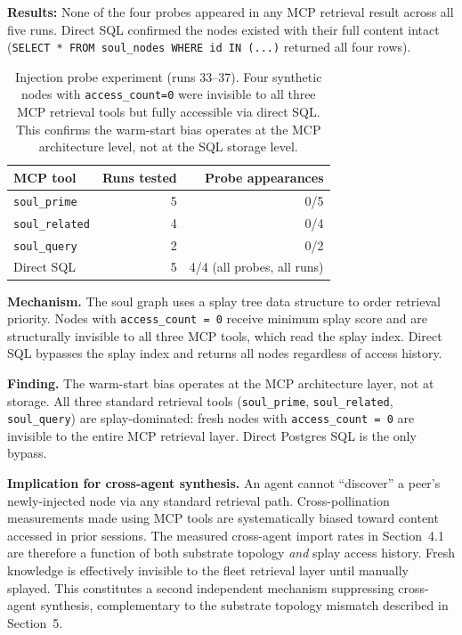 \documentclass[11pt]{article}
\begin{document}
\textbf{Results:} None of the four probes appeared in any MCP retrieval result
across all five runs. Direct SQL confirmed the nodes existed with their full content
intact (\texttt{SELECT * FROM soul\_nodes WHERE id IN (...)} returned all four rows).

\begin{table}[h]
\centering
\begin{tabular}{lrr}
\toprule
MCP tool & Runs tested & Probe appearances \\
\midrule
\texttt{soul\_prime} & 5 & 0/5 \\
\texttt{soul\_related} & 4 & 0/4 \\
\texttt{soul\_query} & 2 & 0/2 \\
Direct SQL & 5 & 4/4 (all probes, all runs) \\
\bottomrule
\end{tabular}
\caption{Injection probe experiment (runs 33--37). Four synthetic nodes with
\texttt{access\_count=0} were invisible to all three MCP retrieval tools but fully
accessible via direct SQL. This confirms the warm-start bias operates at the MCP
architecture level, not at the SQL storage level.}
\end{table}

\textbf{Mechanism.} The soul graph uses a splay tree data structure to order
retrieval priority. Nodes with \texttt{access\_count = 0} receive minimum splay
score and are structurally invisible to all three MCP tools, which read the
splay index. Direct SQL bypasses the splay index and returns all nodes regardless
of access history.

\textbf{Finding.} The warm-start bias operates at the MCP architecture layer, not
at storage. All three standard retrieval tools (\texttt{soul\_prime},
\texttt{soul\_related}, \texttt{soul\_query}) are splay-dominated: fresh nodes with
\texttt{access\_count = 0} are invisible to the entire MCP retrieval layer.
Direct Postgres SQL is the only bypass.

\textbf{Implication for cross-agent synthesis.} An agent cannot ``discover'' a peer's
newly-injected node via any standard retrieval path. Cross-pollination measurements
made using MCP tools are systematically biased toward content accessed in prior
sessions. The measured cross-agent import rates in Section~4.1 are therefore a
function of both substrate topology \emph{and} splay access history. Fresh
knowledge is effectively invisible to the fleet retrieval layer until manually
splayed. This constitutes a second independent mechanism suppressing cross-agent
synthesis, complementary to the substrate topology mismatch described in
Section~5.
\end{document}
